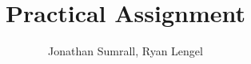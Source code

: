 \documentclass[]{apa}
\affiliation{1DV200}
\author{Jonathan Sumrall, Ryan Lengel}
\title{Practical Assignment}
\begin{document}
\maketitle{}
\end{document}
